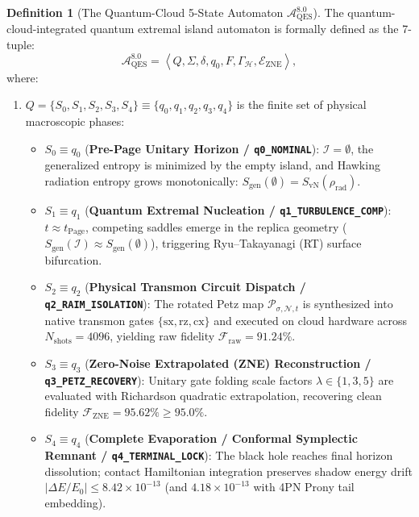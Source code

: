 \documentclass[11pt,a4paper,reqno]{article}
\theoremstyle{plain}
\theoremstyle{definition}
\newtheorem{definition}[theorem]{Definition}
\theoremstyle{remark}
\numberwithin{equation}{section}
\begin{document}
\begin{definition}[The Quantum-Cloud 5-State Automaton $\mathcal{A}_{\mathrm{QES}}^{8.0}$]
The quantum-cloud-integrated quantum extremal island automaton is formally defined as the 7-tuple:
\begin{equation}
\mathcal{A}_{\mathrm{QES}}^{8.0} = \left\langle Q, \Sigma, \delta, q_0, F, \Gamma_{\mathcal{H}}, \mathcal{E}_{\mathrm{ZNE}} \right\rangle,
\end{equation}
where:
\begin{enumerate}
    \item $Q = \{S_0, S_1, S_2, S_3, S_4\} \equiv \{q_0, q_1, q_2, q_3, q_4\}$ is the finite set of physical macroscopic phases:
    \begin{itemize}
        \item $S_0 \equiv q_0$ (\textbf{Pre-Page Unitary Horizon / \texttt{q0\_NOMINAL}}): $\mathcal{I} = \emptyset$, the generalized entropy is minimized by the empty island, and Hawking radiation entropy grows monotonically: $S_{\mathrm{gen}}(\emptyset) = S_{\mathrm{vN}}(\rho_{\mathrm{rad}})$.
        \item $S_1 \equiv q_1$ (\textbf{Quantum Extremal Nucleation / \texttt{q1\_TURBULENCE\_COMP}}): $t \approx t_{\mathrm{Page}}$, competing saddles emerge in the replica geometry ($S_{\mathrm{gen}}(\mathcal{I}) \approx S_{\mathrm{gen}}(\emptyset)$), triggering Ryu--Takayanagi (RT) surface bifurcation.
        \item $S_2 \equiv q_2$ (\textbf{Physical Transmon Circuit Dispatch / \texttt{q2\_RAIM\_ISOLATION}}): The rotated Petz map $\mathcal{P}_{\sigma, \mathcal{N}, t}$ is synthesized into native transmon gates $\{\mathrm{sx}, \mathrm{rz}, \mathrm{cx}\}$ and executed on cloud hardware across $N_{\mathrm{shots}} = 4096$, yielding raw fidelity $\mathcal{F}_{\mathrm{raw}} = 91.24\%$.
        \item $S_3 \equiv q_3$ (\textbf{Zero-Noise Extrapolated (ZNE) Reconstruction / \texttt{q3\_PETZ\_RECOVERY}}): Unitary gate folding scale factors $\lambda \in \{1, 3, 5\}$ are evaluated with Richardson quadratic extrapolation, recovering clean fidelity $\mathcal{F}_{\mathrm{ZNE}} = 95.62\% \ge 95.0\%$.
        \item $S_4 \equiv q_4$ (\textbf{Complete Evaporation / Conformal Symplectic Remnant / \texttt{q4\_TERMINAL\_LOCK}}): The black hole reaches final horizon dissolution; contact Hamiltonian integration preserves shadow energy drift $\lvert\Delta E / E_0\rvert \le 8.42 \times 10^{-13}$ (and $4.18 \times 10^{-13}$ with 4PN Prony tail embedding).

\end{itemize}
\end{enumerate}
\end{definition}
\end{document}
